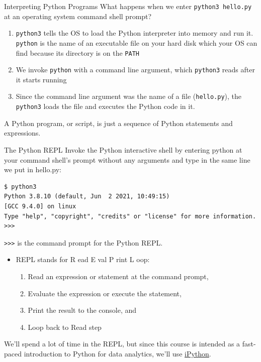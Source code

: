 \documentclass[smaller, aspectratio=1610]{beamer}
\begin{document}
\begin{frame}[label={sec:org3ed115a},fragile]{Interpreting Python Programs}
 What happens when we enter \texttt{python3 hello.py} at an operating system command shell prompt?

\begin{enumerate}
\item \texttt{python3} tells the OS to load the Python interpreter into memory and run it. \texttt{python} is the name of an executable file on your hard disk which your OS can find because its directory is on the \texttt{PATH}
\item We invoke \texttt{python} with a \alert{command line argument}, which \texttt{python3} reads after it starts running
\item Since the command line argument was the name of a file (\texttt{hello.py}), the \texttt{python3} loads the file and executes the Python code in it.
\end{enumerate}

A Python program, or script, is just a sequence of Python statements and expressions.
\end{frame}

\begin{frame}[label={sec:org87a8b92},fragile]{The Python REPL}
 Invoke the Python interactive shell by entering python at your command shell’s prompt without any arguments and type in the same line we put in hello.py:

\lstset{language=sh,label= ,caption= ,captionpos=b,numbers=none}
\begin{lstlisting}
$ python3
Python 3.8.10 (default, Jun  2 2021, 10:49:15)
[GCC 9.4.0] on linux
Type "help", "copyright", "credits" or "license" for more information.
>>>
\end{lstlisting}

\texttt{>>>} is the command prompt for the Python REPL.

\begin{itemize}
\item REPL stands for \alert{R} ead \alert{E} val \alert{P} rint \alert{L} oop:
\begin{enumerate}
\item \alert{Read} an expression or statement at the command prompt,
\item \alert{Evaluate} the expression or execute the statement,
\item \alert{Print} the result to the console, and
\item \alert{Loop} back to \alert{Read} step
\end{enumerate}
\end{itemize}

We’ll spend a lot of time in the REPL, but since this course is intended as a fast-paced introduction to Python for data analytics, we'll use \href{https://ipython.org/}{iPython}.
\end{frame}
\end{document}

